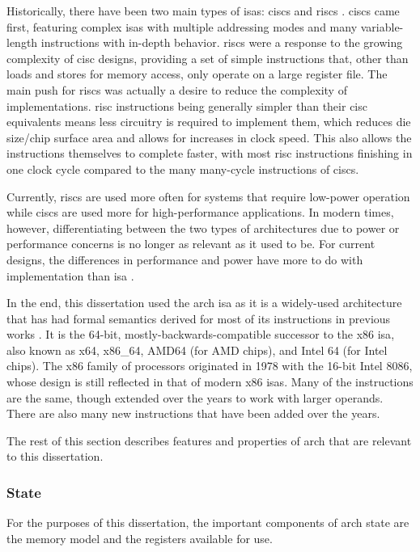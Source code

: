 Historically, there have been two main types of \acp{isa}:
\acp{cisc} and \acp{risc} \autocite{jamil1995rc}.
\Acp{cisc} came first, featuring complex \acp{isa} with multiple addressing modes
and many variable-length instructions with in-depth behavior.
\Acp{risc} were a response to the growing complexity of \ac{cisc} designs,
providing a set of simple instructions that,
other than loads and stores for memory access, only operate on a large register file.
The main push for \acp{risc} was actually a desire
to reduce the complexity of implementations. \Ac{risc} instructions being
generally simpler than their \ac{cisc} equivalents
means less circuitry is required to implement them,
which reduces die size/chip surface area and allows for increases in clock speed.
This also allows the instructions themselves to complete faster,
with most \ac{risc} instructions finishing in one clock cycle
compared to the many many-cycle instructions of \acp{cisc}.

Currently, \acp{risc} are used more often for systems that require
low-power operation while \acp{cisc} are used more for high-performance applications.
In modern times, however, differentiating between the two types of architectures
due to power or performance concerns is no longer as relevant as it used to be.
For current designs, the differences in performance and power
have more to do with implementation than \ac{isa} \autocite{blem2013struggles}.

In the end,
this dissertation used the \gls{arch} \ac{isa} as it is a widely-used architecture
that has had formal semantics derived for most of its instructions
in previous works \autocite{heule2016stratified,roessle2019}.
It is the 64-bit, mostly-backwards-compatible successor to the x86 \ac{isa},
also known as x64, x86\_64, AMD64 (for AMD chips), and Intel 64 (for Intel chips).
The x86 family of processors originated in 1978 with the 16-bit Intel 8086,
whose design is still reflected in that of modern x86 \acp{isa}.
Many of the instructions are the same,
though extended over the years to work with larger operands.
There are also many new instructions that have been added over the years.

The rest of this section describes features and properties of \gls{arch} that are relevant
to this dissertation.

\subsubsection{State}
For the purposes of this dissertation,
the important components of \gls{arch} state are the memory model
and the registers available for use.

